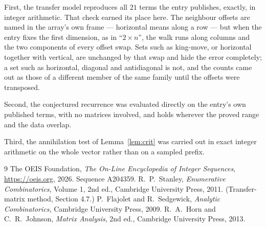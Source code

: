 \documentclass[11pt,a4paper]{article}
\theoremstyle{plain}
\theoremstyle{definition}
\begin{document}
First, the transfer model reproduces all $21$ terms the entry publishes, exactly, in
integer arithmetic. That check earned its place here. The neighbour offsets are named in the
array's own frame --- horizontal means along a row --- but when the entry fixes the first
dimension, as in ``$2\times n$'', the walk runs along columns and the two components of every
offset swap. Sets such as king-move, or horizontal together with vertical, are unchanged by
that swap and hide the error completely; a set such as horizontal, diagonal and antidiagonal
is not, and the counts came out as those of a different member of the same family until the
offsets were transposed.

Second, the conjectured recurrence was evaluated directly on the entry's own published terms,
with no matrices involved, and holds wherever the proved range and the data overlap.

Third, the annihilation test of Lemma~\ref{lem:crit} was carried out in exact integer
arithmetic on the whole vector rather than on a sampled prefix.

\begin{thebibliography}{9}
 The OEIS Foundation, \emph{The On-Line Encyclopedia of Integer
Sequences}, \url{https://oeis.org}, 2026. Sequence A204359.
 R.~P.~Stanley, \emph{Enumerative Combinatorics}, Volume 1, 2nd ed.,
Cambridge University Press, 2011. (Transfer-matrix method, Section 4.7.)
 P.~Flajolet and R.~Sedgewick, \emph{Analytic Combinatorics}, Cambridge
University Press, 2009.
 R.~A.~Horn and C.~R.~Johnson, \emph{Matrix Analysis}, 2nd ed., Cambridge
University Press, 2013.
\end{thebibliography}
\end{document}
